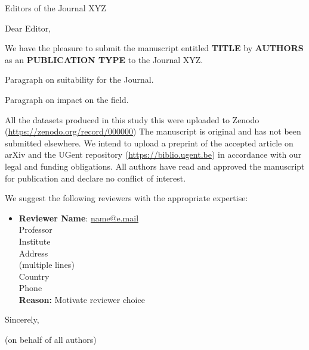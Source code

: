 \documentclass[faculty=we,rightcolwidth=.38]{ugent-letter}
\begin{document}
\mydate{\today}
\mysubject{}

\begin{letter}{
Editors of the Journal XYZ
}

\opening{Dear Editor,}

We have the pleasure to submit the manuscript entitled
\textbf{TITLE}
by \textbf{AUTHORS} as an \textbf{PUBLICATION TYPE} to the Journal XYZ.

Paragraph on suitability for the Journal.

Paragraph on impact on the field.

All the datasets produced in this study this were uploaded to Zenodo (\url{https://zenodo.org/record/000000}) The manuscript is original and has not been submitted elsewhere.
We intend to upload a preprint of the accepted article on arXiv and the UGent repository (\url{https://biblio.ugent.be}) in accordance with our legal and funding obligations.
All authors have read and approved the manuscript for publication and declare no conflict of interest.

We suggest the following reviewers with the appropriate expertise:
%
\begin{itemize}[itemsep=12pt]
    \item
    \begin{minipage}[t]{\linewidth}
    \textbf{Reviewer Name}: \href{mailto:name@e.mail}{name@e.mail} \\
    Professor \\
    Institute \\
    Address \\
    (multiple lines) \\
    Country \\
    Phone \\
    \textbf{Reason:} Motivate reviewer choice
    \end{minipage}
\end{itemize}

\closing{Sincerely,}
(on behalf of all authors)

\end{letter}
\end{document}
